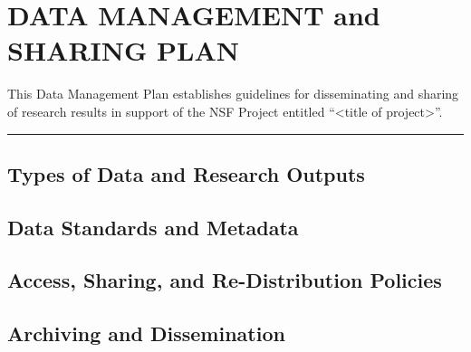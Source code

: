 \documentclass[../preamble.tex]{subfiles}
\begin{document}
\section{DATA MANAGEMENT and SHARING PLAN}

This Data Management Plan establishes guidelines for disseminating and sharing of research results in support of the NSF Project entitled ``<title of project>''. 
\vpn\rule{\textwidth}{0.4pt}

\subsection{Types of Data and Research Outputs}

\subsection{Data Standards and Metadata}

\subsection{Access, Sharing, and Re-Distribution Policies}

\subsection{Archiving and Dissemination}
\end{document}

